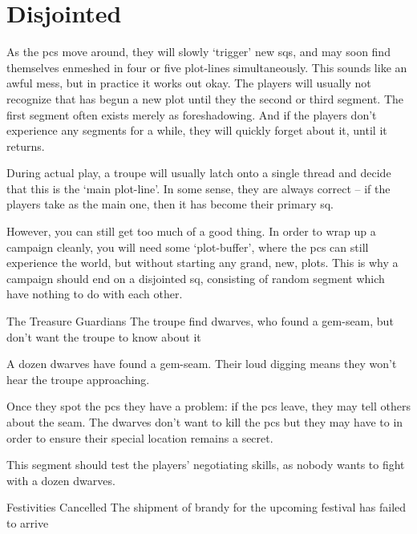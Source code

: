 \section{Disjointed }

\begin{multicols}{2}

\noindent
As the \glspl{pc} move around, they will slowly `trigger' new \glspl{sq}, and may soon find themselves enmeshed in four or five plot-lines simultaneously.
This sounds like an awful mess, but in practice it works out okay.
The players will usually not recognize that  has begun a new plot until they the second or third \gls{segment}.
The first \gls{segment} often exists merely as foreshadowing.
And if the players don't experience any \glspl{segment} for a while, they will quickly forget about it, until it returns.

During actual play, a troupe will usually latch onto a single thread and decide that this is the `main plot-line'.
In some sense, they are always correct -- if the players take  as the main one, then it has become their primary \gls{sq}.

However, you can still get too much of a good thing.
In order to wrap up a campaign cleanly, you will need some `plot-buffer', where the \glspl{pc} can still experience the world, but without starting any grand, new, plots.
This is why a campaign should end on a disjointed \gls{sq}, consisting of random \gls{segment} which have nothing to do with each other.


{The Treasure Guardians}%
{The troupe find dwarves, who found a gem-seam, but don't want the troupe to know about it}%

A dozen dwarves have found a gem-seam.
Their loud digging means they won't hear the troupe approaching.

Once they spot the \glspl{pc} they have a problem: if the \glspl{pc} leave, they may tell others about the seam.
The dwarves don't want to kill the \glspl{pc} but they may have to in order to ensure their special location remains a secret.

This \gls{segment} should test the players' negotiating skills, as nobody wants to fight with a dozen dwarves.

{Festivities Cancelled}%
{The shipment of brandy for the upcoming festival has failed to arrive}%


\end{multicols}
